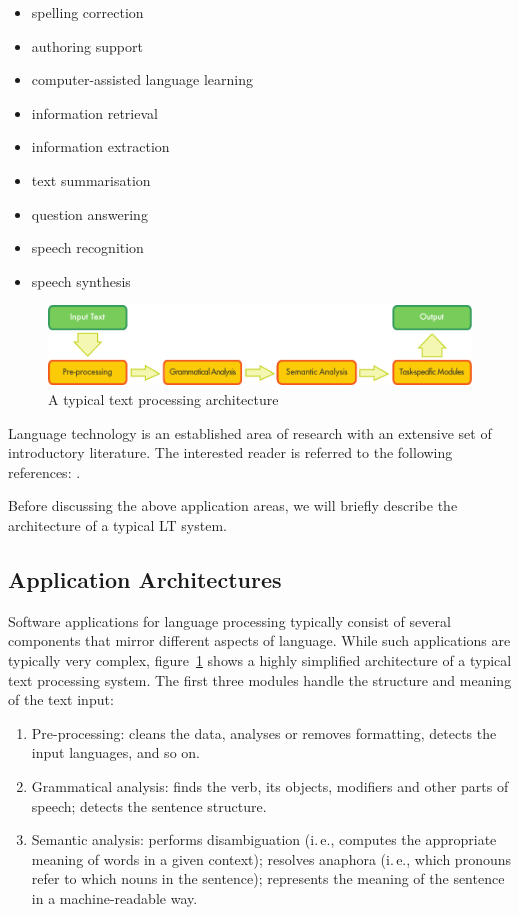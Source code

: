 \documentclass[]{../../metanetpaper}
\begin{document}
\begin{multicols}{2}
\begin{itemize}
\item spelling correction
\item authoring support
\item computer-assisted language learning
\item information retrieval 
\item information extraction
\item text summarisation
\item question answering
\item speech recognition 
\item speech synthesis 
\end{itemize}

\begin{figure}[b]
  \center
  \includegraphics[width=\textwidth]{../_media/english/text_processing_app_architecture}
  \caption{A typical text processing architecture}
  \label{fig:textprocessingarch_en}
\end{figure}

Language technology is an established area of research with an extensive set of introductory literature. The interested reader is referred to the following references:  \cite{jurafsky-martin01,manning-schuetze1,lt-world1,lt-survey1}.

Before discussing the above application areas, we will briefly describe the architecture of a typical LT system.

\subsection{Application Architectures}

Software applications for language processing typically consist of several components that mirror different aspects of language. While such applications are typically very complex, figure~\ref{fig:textprocessingarch_en} shows a highly simplified architecture of a typical text processing system. The first three modules handle the structure and meaning of the text input:

\begin{enumerate}
\item Pre-processing: cleans the data, analyses or removes formatting, detects the input languages, and so on.
\item Grammatical analysis: finds the verb, its objects, modifiers and other parts of speech; detects the sentence structure.
\item Semantic analysis: performs disambiguation (i.\,e., computes the appropriate meaning of words in a given context); resolves anaphora (i.\,e., which pronouns refer to which nouns in the sentence); represents the meaning of the sentence in a machine-readable way.
\end{enumerate}


\end{multicols}
\end{document}
